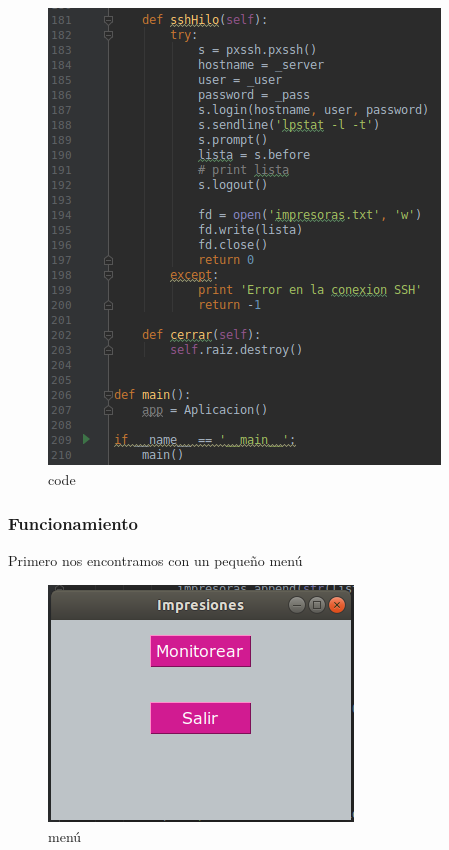 \FloatBarrier
\begin{figure}[htbp!]
		\centering
			\includegraphics[width=.9\textwidth]{images/s6}
		\caption{code}
		\label{image:s6}
\end{figure}
\FloatBarrier




\subsubsection{Funcionamiento}

Primero nos encontramos con un pequeño menú
\FloatBarrier
\begin{figure}[htbp!]
		\centering
			\includegraphics[width=.9\textwidth]{images/s7}
		\caption{menú}
		\label{image:s7}
\end{figure}
\FloatBarrier

